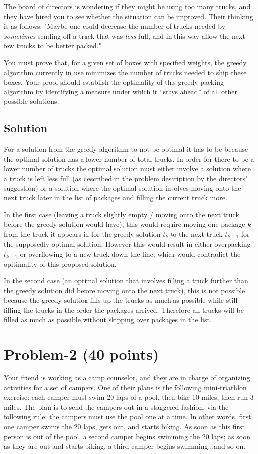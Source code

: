\documentclass[11pt]{article}
\begin{document}
The board of directors is wondering if they might be using too many trucks, and they have hired you to see whether the situation can be improved. Their thinking is as follows: "Maybe one could decrease the number of trucks needed by {\it sometimes} sending off a truck that was {\it less} full, and in this way allow the next few trucks to be better packed."

You must prove that, for a given set of boxes with specified weights, the greedy algorithm currently in use minimizes the number of trucks needed to ship these boxes. Your proof should establish the optimality of this greedy packing algorithm by identifying a measure under which it “stays ahead” of all other possible solutions.


\subsection*{Solution}
For a solution from the greedy algorithm to not be optimal it has to be because the optimal solution has a lower number of total trucks. In order for there to be a lower number of trucks the optimal solution must either involve a solution where a truck is left less full (as described in the problem description by the directors' suggestion) or a solution where the optimal solution involves moving onto the next truck later in the list of packages and filling the current truck more.

In the first case (leaving a truck slightly empty / moving onto the next truck before the greedy solution would have), this would require moving one package $k$ from the truck it appears in for the greedy solution $t_k$ to the next truck $t_{k+1}$ for the supposedly optimal solution. However this would result in either overpacking $t_{k+1}$ or overflowing to a new truck down the line, which would contradict the opitimality of this proposed solution.

In the second case (an optimal solution that involves filling a truck further than the greedy solution did before moving onto the next truck), this is not possible because the greedy solution fills up the trucks as much as possible while still filling the trucks in the order the packages arrived. Therefore all trucks will be filled as much as possible without skipping over packages in the list.



\newpage
\section*{Problem-2 (40 points)}
\noindent
Your friend is working as a camp counselor, and they are in charge of organizing activities for a set of campers. One of their plans is the following mini-triathlon exercise: each camper must swim 20 laps of a pool, then bike 10 miles, then run 3 miles. The plan is to send the campers out in a staggered fashion, via the following rule: the campers must use the pool one at a time. In other words, first one camper swims the 20 laps, gets out, and starts biking. As soon as this first person is out of the pool, a second camper begins swimming the 20 laps; as soon as they are out and starts biking, a third camper begins swimming...and so on.
\end{document}
